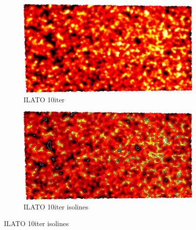 \begin{figure}[ht]
{	\bigskip
	\begin{subfigure}[b]{0.48\linewidth}
		\includegraphics[width=1.0\linewidth,height=0.3\textheight,keepaspectratio]{data/acquired_meshes/ILATO_1A_SM2066-HE5-60_070214_merged_GMO_r1_n4_v256_funcvals_1000iter.png}
		\caption{ILATO 10iter}\label{fig:ILATO.c}
	\end{subfigure}
	\begin{subfigure}[b]{0.48\linewidth}
		\includegraphics[width=1.0\linewidth,height=0.3\textheight,keepaspectratio]{data/acquired_meshes/ILATO_1A_SM2066-HE5-60_070214_merged_GMO_r1_n4_v256_funcvals_isolines_1000iter.png}
		\caption{ILATO 10iter isolines}\label{fig:ILATO.d}
	\end{subfigure}

}
\end{figure}
